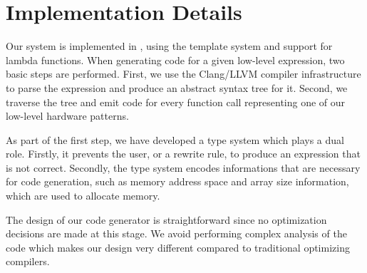 

\section{Implementation Details}

Our system is implemented in \Cpp, using the template system and support for lambda functions. 
When generating code for a given low-level expression, two basic steps are performed.
First, we use the Clang/LLVM compiler infrastructure to parse the expression and produce an abstract syntax tree for it.
Second, we traverse the tree and emit code for every function call representing one of our low-level hardware patterns.

As part of the first step, we have developed a type system which plays a dual role.
Firstly, it prevents the user, or a rewrite rule, to produce an expression that is not correct.
Secondly, the type system encodes informations that are necessary for code generation, such as memory address space and array size information, which are used to allocate memory.

The design of our code generator is straightforward since no optimization decisions are made at this stage.
We avoid performing complex analysis of the code which makes our design very different compared to traditional optimizing compilers.

